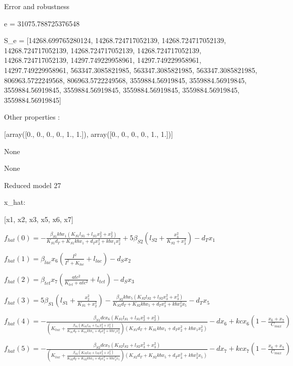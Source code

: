Error and robustness 


e = 31075.788725376548

S_e = [14268.699765280124, 14268.724717052139, 14268.724717052139, 14268.724717052139, 14268.724717052139, 14268.724717052139, 14268.724717052139, 14297.749229958961, 14297.749229958961, 14297.749229958961, 563347.3085821985, 563347.3085821985, 563347.3085821985, 806963.5722249568, 806963.5722249568, 3559884.56919845, 3559884.56919845, 3559884.56919845, 3559884.56919845, 3559884.56919845, 3559884.56919845, 3559884.56919845]

Other properties :


[array([0., 0., 0., 0., 1., 1.]), array([0., 0., 0., 0., 1., 1.])]

None

None

Reduced model 27

x_{hat}: 

[x1, x2, x3, x5, x6, x7]


$f_{hat}(0)=- \frac{\beta_{S1} kb x_{1} \left(K_{S1} l_{S1} + l_{S1} x_{2}^{2} + x_{2}^{2}\right)}{K_{S1} d_{T} + K_{S1} kb x_{1} + d_{T} x_{2}^{2} + kb x_{1} x_{2}^{2}} + 5 \beta_{S2} \left(l_{S2} + \frac{x_{3}^{2}}{K_{S2} + x_{3}^{2}}\right) - d_{T} x_{1}$


$f_{hat}(1)=\beta_{lac} x_{6} \left(\frac{I^{2}}{I^{2} + K_{lac}} + l_{lac}\right) - d_{S} x_{2}$


$f_{hat}(2)=\beta_{tet} x_{7} \left(\frac{atc^{2}}{K_{tet} + atc^{2}} + l_{tet}\right) - d_{S} x_{3}$


$f_{hat}(3)=5 \beta_{S1} \left(l_{S1} + \frac{x_{2}^{2}}{K_{S1} + x_{2}^{2}}\right) - \frac{\beta_{S2} kb x_{5} \left(K_{S2} l_{S2} + l_{S2} x_{3}^{2} + x_{3}^{2}\right)}{K_{S2} d_{T} + K_{S2} kb x_{5} + d_{T} x_{3}^{2} + kb x_{3}^{2} x_{5}} - d_{T} x_{5}$


$f_{hat}(4)=- \frac{\beta_{S1} dc x_{6} \left(K_{S1} l_{S1} + l_{S1} x_{2}^{2} + x_{2}^{2}\right)}{\left(K_{tox} + \frac{\beta_{S1} \left(K_{S1} l_{S1} + l_{S1} x_{2}^{2} + x_{2}^{2}\right)}{K_{S1} d_{T} + K_{S1} kb x_{1} + d_{T} x_{2}^{2} + kb x_{1} x_{2}^{2}}\right) \left(K_{S1} d_{T} + K_{S1} kb x_{1} + d_{T} x_{2}^{2} + kb x_{1} x_{2}^{2}\right)} - d x_{6} + kc x_{6} \left(1 - \frac{x_{6} + x_{7}}{C_{max}}\right)$


$f_{hat}(5)=- \frac{\beta_{S2} dc x_{7} \left(K_{S2} l_{S2} + l_{S2} x_{3}^{2} + x_{3}^{2}\right)}{\left(K_{tox} + \frac{\beta_{S2} \left(K_{S2} l_{S2} + l_{S2} x_{3}^{2} + x_{3}^{2}\right)}{K_{S2} d_{T} + K_{S2} kb x_{5} + d_{T} x_{3}^{2} + kb x_{3}^{2} x_{5}}\right) \left(K_{S2} d_{T} + K_{S2} kb x_{5} + d_{T} x_{3}^{2} + kb x_{3}^{2} x_{5}\right)} - d x_{7} + kc x_{7} \left(1 - \frac{x_{6} + x_{7}}{C_{max}}\right)$



